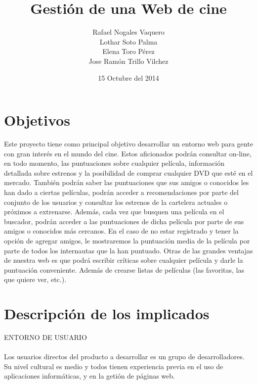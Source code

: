 \documentclass{article}
\title{Gestión de una Web de cine}
\author{Rafael Nogales Vaquero
\\Lothar Soto Palma
\\Elena Toro Pérez
\\Jose Ramón Trillo Vilchez}
\date{15 Octubre del 2014}
\begin{document}
\maketitle

\section{Objetivos}
Este proyecto tiene como principal objetivo desarrollar un entorno web para gente con gran interés en el mundo del cine.
Estos aficionados podrán consultar on-line, en todo momento, las puntuaciones sobre cualquier película, información
detallada sobre estrenos y la posibilidad de comprar cualquier DVD que esté en el mercado.
También podrán saber las puntuaciones que sus amigos o conocidos les han dado a ciertas películas, podrán acceder a
recomendaciones por parte del conjunto de los usuarios y consultar los estrenos de la cartelera actuales o próximos a
extrenarse.
Además, cada vez que busquen una película en el buscador, podrán acceder a las puntuaciones de dicha película por parte de
sus amigos o conocidos más cercanos.
En el caso de no estar registrado y tener la opción de agregar amigos, le mostraremos la puntuación media de la película
por parte de todos los internautas que la han puntuado.
Otras de las grandes ventajas de nuestra web es que podrá escribir críticas sobre cualquier película y darle la puntuación
conveniente. Además de crearse listas de películas (las favoritas, las que quiere ver, etc.).
\section{Descripción de los implicados}
ENTORNO DE USUARIO
\\ \\
Los usuarios directos del producto a desarrollar es un grupo de desarrolladores. Su nivel cultural es medio y todos tienen experiencia previa en el uso de aplicaciones informáticas, y en la getión de páginas web. \\ \\ \\ \\ \\
\end{document}
